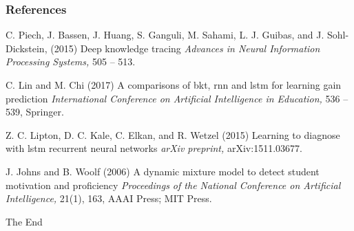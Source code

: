 \documentclass{beamer}
\begin{document}
\begin{frame}
\frametitle{References}
\begin{footnotesize}
	\begin{thebibliography}{99}
		 C. Piech, J. Bassen, J. Huang, S. Ganguli, M. Sahami, L. J. Guibas, and J. Sohl-Dickstein, (2015)
		\newblock Deep knowledge tracing
		\newblock \emph{Advances in Neural Information Processing Systems,} 505 -- 513.
		
		 C. Lin and M. Chi (2017)
		\newblock A comparisons of bkt, rnn and lstm for learning gain prediction
		\newblock \emph{International Conference on Artificial Intelligence in Education,} 536 -- 539, Springer.
		
		 Z. C. Lipton, D. C. Kale, C. Elkan, and R. Wetzel (2015)
		\newblock Learning to diagnose with lstm recurrent neural networks
		\newblock \emph{arXiv preprint,} arXiv:1511.03677.
		
		 J. Johns and B. Woolf (2006)
		\newblock A dynamic mixture model to detect student motivation and proficiency
		\newblock \emph{Proceedings of the National Conference on Artificial Intelligence,} 21(1), 163, AAAI Press; MIT Press.
	\end{thebibliography}
\end{footnotesize}
\end{frame}


\begin{frame}
\Huge{\centerline{The End}}
\end{frame}

\end{document}
